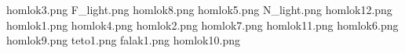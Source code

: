 homlok3.png
F_light.png
homlok8.png
homlok5.png
N_light.png
homlok12.png
homlok1.png
homlok4.png
homlok2.png
homlok7.png
homlok11.png
homlok6.png
homlok9.png
teto1.png
falak1.png
homlok10.png
